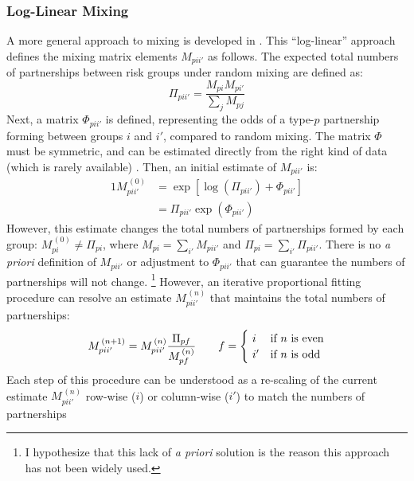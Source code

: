 \subsubsection{Log-Linear Mixing}
A more general  approach to mixing is developed in \cite{Morris1991}.
This ``log-linear'' approach defines the mixing matrix elements $M_{pii'}$ as follows.
The expected total numbers of partnerships between risk groups under random mixing are defined as:
\begin{equation}\label{eq:mix.rand}
  \Pi_{pii'} = \frac{M_{pi} M_{pi'}}{\sum_{j} M_{pj}}
\end{equation}
Next, a matrix $\Phi_{pii'}$ is defined, representing the odds of
a type-$p$ partnership forming between groups $i$ and $i'$, compared to random mixing.
The matrix $\Phi$ must be symmetric,
and can be estimated directly from the right kind of data
(which is rarely available) \cite{Morris1991}.
Then, an initial estimate of $M_{pii'}$ is:
\begin{alignat}{1}
  M_{pii'}^{\,(0)} &= \exp{\left[\log{\left(\Pi_{pii'}\right)} + \Phi_{pii'} \right]} \nonumber\\
                 &= \Pi_{pii'} \exp{\left(\Phi_{pii'}\right)} \label{eq:mix.M0}
\end{alignat}
However, this estimate changes the total numbers of partnerships formed by each group:
$M_{pi}^{\,(0)} \ne \Pi_{pi}$, where
$M_{pi} = \sum_{i'} M_{pii'}$ and $\Pi_{pi} = \sum_{i'} \Pi_{pii'}$.
There is no \textit{a priori} definition of $M_{pii'}$ or adjustment to $\Phi_{pii'}$
that can guarantee the numbers of partnerships will not change.%
\footnote{I hypothesize that this lack of \textit{a priori} solution
  is the reason this approach has not been widely used.}
However, an iterative proportional fitting procedure \cite{Ruschendorf1995}
can resolve an estimate $M_{pii'}^{\,(n)}$ that maintains the total numbers of partnerships:
\begin{equation}\label{eq:mix.iter}
  M_{pii'}^{\,(n+1)} = M_{pii'}^{\,(n)} \frac{\Pi_{pf}}{M_{pf}^{\,(n)}}
  \qquad f = \begin{cases}
    ~i  & \textnormal{if $n$ is even} \\
    ~i' & \textnormal{if $n$ is odd}
  \end{cases}
\end{equation}
Each step of this procedure can be understood as
a re-scaling of the current estimate $M_{pii'}^{\,(n)}$
row-wise ($i$) or column-wise ($i'$) to match the numbers of partnerships
